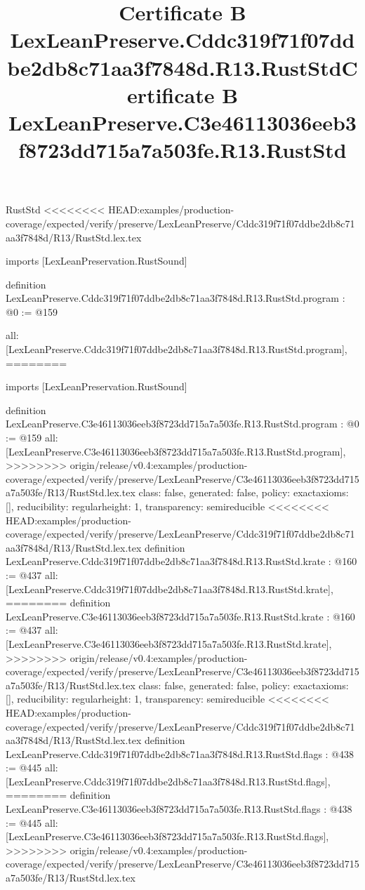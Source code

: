 \begin{lexlean}{RustStd}
<<<<<<<< HEAD:examples/production-coverage/expected/verify/preserve/LexLeanPreserve/Cddc319f71f07ddbe2db8c71aa3f7848d/R13/RustStd.lex.tex
\title{Certificate B LexLeanPreserve.Cddc319f71f07ddbe2db8c71aa3f7848d.R13.RustStd}
\begin{coremodule}
imports [LexLeanPreservation.RustSound]

definition LexLeanPreserve.Cddc319f71f07ddbe2db8c71aa3f7848d.R13.RustStd.program : @0 := @159 {
  all: [LexLeanPreserve.Cddc319f71f07ddbe2db8c71aa3f7848d.R13.RustStd.program],
========
\title{Certificate B LexLeanPreserve.C3e46113036eeb3f8723dd715a7a503fe.R13.RustStd}
\begin{coremodule}
imports [LexLeanPreservation.RustSound]

definition LexLeanPreserve.C3e46113036eeb3f8723dd715a7a503fe.R13.RustStd.program : @0 := @159 {
  all: [LexLeanPreserve.C3e46113036eeb3f8723dd715a7a503fe.R13.RustStd.program],
>>>>>>>> origin/release/v0.4:examples/production-coverage/expected/verify/preserve/LexLeanPreserve/C3e46113036eeb3f8723dd715a7a503fe/R13/RustStd.lex.tex
  class: false,
  generated: false,
  policy: exact{axioms: []},
  reducibility: regular{height: 1},
  transparency: semireducible
}
<<<<<<<< HEAD:examples/production-coverage/expected/verify/preserve/LexLeanPreserve/Cddc319f71f07ddbe2db8c71aa3f7848d/R13/RustStd.lex.tex
definition LexLeanPreserve.Cddc319f71f07ddbe2db8c71aa3f7848d.R13.RustStd.krate : @160 := @437 {
  all: [LexLeanPreserve.Cddc319f71f07ddbe2db8c71aa3f7848d.R13.RustStd.krate],
========
definition LexLeanPreserve.C3e46113036eeb3f8723dd715a7a503fe.R13.RustStd.krate : @160 := @437 {
  all: [LexLeanPreserve.C3e46113036eeb3f8723dd715a7a503fe.R13.RustStd.krate],
>>>>>>>> origin/release/v0.4:examples/production-coverage/expected/verify/preserve/LexLeanPreserve/C3e46113036eeb3f8723dd715a7a503fe/R13/RustStd.lex.tex
  class: false,
  generated: false,
  policy: exact{axioms: []},
  reducibility: regular{height: 1},
  transparency: semireducible
}
<<<<<<<< HEAD:examples/production-coverage/expected/verify/preserve/LexLeanPreserve/Cddc319f71f07ddbe2db8c71aa3f7848d/R13/RustStd.lex.tex
definition LexLeanPreserve.Cddc319f71f07ddbe2db8c71aa3f7848d.R13.RustStd.flags : @438 := @445 {
  all: [LexLeanPreserve.Cddc319f71f07ddbe2db8c71aa3f7848d.R13.RustStd.flags],
========
definition LexLeanPreserve.C3e46113036eeb3f8723dd715a7a503fe.R13.RustStd.flags : @438 := @445 {
  all: [LexLeanPreserve.C3e46113036eeb3f8723dd715a7a503fe.R13.RustStd.flags],
>>>>>>>> origin/release/v0.4:examples/production-coverage/expected/verify/preserve/LexLeanPreserve/C3e46113036eeb3f8723dd715a7a503fe/R13/RustStd.lex.tex
}}}
\end{coremodule}}
\end{coremodule}
\end{lexlean}

